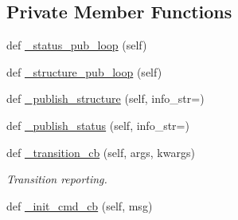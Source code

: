 \subsection*{Private Member Functions}
\begin{DoxyCompactItemize}
\item 
def \hyperlink{classsmacc__viewer_1_1introspection__container_1_1ContainerProxy_add467b244a7907cd5717d352985e72b3}{\+\_\+status\+\_\+pub\+\_\+loop} (self)
\item 
def \hyperlink{classsmacc__viewer_1_1introspection__container_1_1ContainerProxy_a961c2c7555832c199b14786064d94244}{\+\_\+structure\+\_\+pub\+\_\+loop} (self)
\item 
def \hyperlink{classsmacc__viewer_1_1introspection__container_1_1ContainerProxy_a8d2ce0de04a41de61fea7a831b5d978d}{\+\_\+publish\+\_\+structure} (self, info\+\_\+str=\textquotesingle{}\textquotesingle{})
\item 
def \hyperlink{classsmacc__viewer_1_1introspection__container_1_1ContainerProxy_ad4a053afedd3cc6cdc2e30b6db418e7e}{\+\_\+publish\+\_\+status} (self, info\+\_\+str=\textquotesingle{}\textquotesingle{})
\item 
def \hyperlink{classsmacc__viewer_1_1introspection__container_1_1ContainerProxy_afdf0dd6e6c530d1906fd4a253c8db883}{\+\_\+transition\+\_\+cb} (self, args, kwargs)
\begin{DoxyCompactList}\small\item\em Transition reporting. \end{DoxyCompactList}\item 
def \hyperlink{classsmacc__viewer_1_1introspection__container_1_1ContainerProxy_ac2ba62ed1b72c1dc6ea8e5badb6f2030}{\+\_\+init\+\_\+cmd\+\_\+cb} (self, msg)
\end{DoxyCompactItemize}
